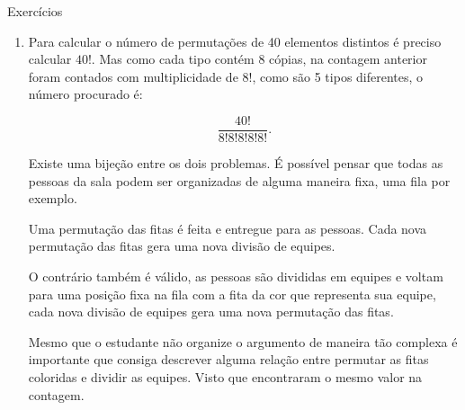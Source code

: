\begin{answer}{Exercícios}
{\begin{enumerate}
Com isso teriam o quociente de todos os casos favoráveis por todos os casos possíveis: 

$$\dfrac{5 \cdot \dfrac{38!}{6!\cdot 8!^4}}{\dfrac{40!}{8!^5}} = \dfrac{5 \cdot 38! \cdot 8!}{6!40!}= \dfrac{7}{39}.$$ O que equivale a


7 chances em 39 de estarem na mesma equipe. 
Pensando em linguagem de agrupamentos, determinar equipes é determinar combinações, ou ainda, subconjuntos de um conjunto com elementos distintos. Assim, fixando uma ordem para os grupos: amarela, vermelha, laranja, branca e preta, teríamos o número total de agrupamentos dado por 
$$C_{40}^8C_{32}^8C_{24}^8C_{16}^8C_{8}^8 =\dfrac{40!}{8!^5} .$$
Agora, observamos que as amigas podem estar juntas de $5$ maneiras diferentes, devemos contar as combinações possíveis se estiverem na equipe amarela, depois as combinações possíveis se estiverem na equipe vermelha e assim por diante. Usando o Princípio Aditivo obtemos o número total de agrupamentos 

$$C_{38}^6C_{32}^8C_{24}^8C_{16}^8C_{8}^8 +C_{38}^8C_{30}^6C_{24}^8C_{16}^8C_{8}^8 +C_{38}^8C_{30}^8C_{22}^6C_{16}^8C_{8}^8 + $$
$$ C_{38}^8C_{30}^8C_{22}^8C_{14}^6C_{8}^8 + C_{38}^8C_{30}^8C_{22}^8C_{14}^8C_{6}^6 = 5 \cdot \dfrac{38!}{6!\cdot 8!^4}.   $$


\item Para calcular o número de permutações de 40 elementos distintos é preciso calcular $40!$. Mas como cada tipo contém 8 cópias, na contagem anterior foram contados com multiplicidade de $8!$, como são 5 tipos diferentes, o número procurado é:

$$\dfrac{40!}{8!8!8!8!8!}.$$

Existe uma bijeção entre os dois problemas. É possível pensar que todas as pessoas da sala podem ser organizadas de alguma maneira fixa, uma fila por exemplo. 

Uma permutação das fitas é feita e entregue para as pessoas. Cada nova permutação das fitas gera uma nova divisão de equipes. 

O contrário também é válido, as pessoas são divididas em equipes e voltam para uma posição fixa na fila com a fita da cor que representa sua equipe, cada nova divisão de equipes gera uma nova permutação das fitas. 

Mesmo que o estudante não organize o argumento de maneira tão complexa é importante que consiga descrever alguma relação entre permutar as fitas coloridas e dividir as equipes. Visto que encontraram o mesmo valor na contagem. 



\end{enumerate}}
\end{answer}
